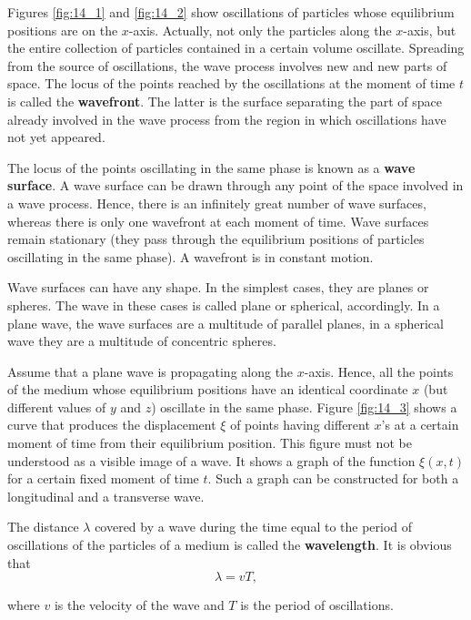 Figures \ref{fig:14_1} and \ref{fig:14_2} show oscillations of particles whose equilibrium positions are on the $x$-axis.
Actually, not only the particles along the $x$-axis, but the entire collection of particles contained in a certain volume oscillate.
Spreading from the source of oscillations, the wave process involves new and new parts of space.
The locus of the points reached by the oscillations at the moment of time $t$ is called the \textbf{wavefront}.
The latter is the surface separating the part of space already involved in the wave process from the region in which oscillations have not yet appeared.

The locus of the points oscillating in the same phase is known as a \textbf{wave surface}.
A wave surface can be drawn through any point of the space involved in a wave process.
Hence, there is an infinitely great number of wave surfaces, whereas there is only one wavefront at each moment of time.
Wave surfaces remain stationary (they pass through the equilibrium positions of particles oscillating in the same phase).
A wavefront is in constant motion.

Wave surfaces can have any shape.
In the simplest cases, they are planes or spheres.
The wave in these cases is called plane or spherical,
accordingly.
In a plane wave, the wave surfaces are a multitude of parallel planes, in a spherical wave they are a multitude of concentric spheres.

Assume that a plane wave is propagating along the $x$-axis.
Hence, all the points of the medium whose equilibrium positions have an identical coordinate $x$ (but different values of $y$ and $z$) oscillate in the same phase.
Figure \ref{fig:14_3} shows a curve that produces the displacement $\xi$ of points having different $x$'s at a certain moment of time from their equilibrium position.
This figure must not be understood as a visible image of a wave.
It shows a graph of the function $\xi(x,t)$ for a certain fixed moment of time $t$.
Such a graph can be constructed for both a longitudinal and a transverse wave.

The distance $\lambda$ covered by a wave during the time equal to the period of oscillations of the particles of a medium is called the \textbf{wavelength}.
It is obvious that
\vspace{-12pt}
\begin{equation}\label{eq:14_1}
    \lambda = vT,
\end{equation}

\noindent
where $v$ is the velocity of the wave and $T$ is the period of oscillations.

